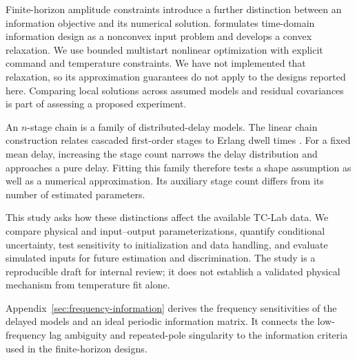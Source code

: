 Finite-horizon amplitude constraints introduce a further distinction between an
information objective and its numerical solution. \citet{manchester-2010-input}
formulates time-domain information design as a nonconvex input problem and
develops a convex relaxation. We use bounded multistart nonlinear optimization
with explicit command and temperature constraints. We have not implemented that
relaxation, so its approximation guarantees do not apply to the designs reported
here. Comparing local solutions across assumed models and residual covariances
is part of assessing a proposed experiment.

An $n$-stage chain is a family of distributed-delay models. The linear chain
construction relates cascaded first-order stages to Erlang dwell times
\citep{hurtado-2019-generalizations}. For a fixed mean delay, increasing the stage
count narrows the delay distribution and approaches a pure delay. Fitting this
family therefore tests a shape assumption as well as a numerical approximation.
Its auxiliary stage count differs from its number of estimated parameters.

This study asks how these distinctions affect the available TC-Lab data. We
compare physical and input--output parameterizations, quantify conditional
uncertainty, test sensitivity to initialization and data handling, and evaluate
simulated inputs for future estimation and discrimination. The study is a
reproducible draft for internal review; it does not establish a validated
physical mechanism from temperature fit alone.

Appendix~\ref{sec:frequency-information} derives the frequency sensitivities
of the delayed models and an ideal periodic information matrix. It connects the
low-frequency lag ambiguity and repeated-pole singularity to the information
criteria used in the finite-horizon designs.
